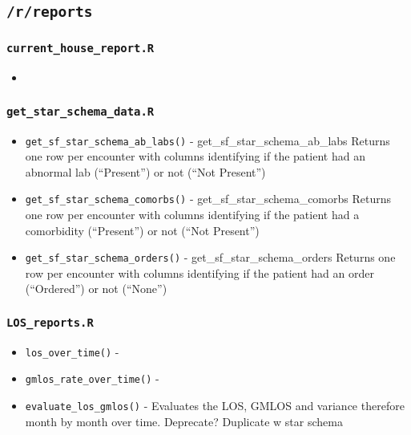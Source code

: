 \documentclass[
]{book}
\providecommand{\tightlist}{%
  \setlength{\itemsep}{0pt}\setlength{\parskip}{0pt}}
\begin{document}
\hypertarget{rreports}{%
\subsection{\texorpdfstring{\texttt{/r/reports}}{/r/reports}}\label{rreports}}

\hypertarget{current_house_report.r}{%
\subsubsection{\texorpdfstring{\texttt{current\_house\_report.R}}{current\_house\_report.R}}\label{current_house_report.r}}

\begin{itemize}
\item
\end{itemize}

\hypertarget{get_star_schema_data.r}{%
\subsubsection{\texorpdfstring{\texttt{get\_star\_schema\_data.R}}{get\_star\_schema\_data.R}}\label{get_star_schema_data.r}}

\begin{itemize}
\tightlist
\item
  \texttt{get\_sf\_star\_schema\_ab\_labs()} - get\_sf\_star\_schema\_ab\_labs Returns one row per encounter with columns identifying if the patient had an abnormal lab (``Present'') or not (``Not Present'')
\item
  \texttt{get\_sf\_star\_schema\_comorbs()} - get\_sf\_star\_schema\_comorbs Returns one row per encounter with columns identifying if the patient had a comorbidity (``Present'') or not (``Not Present'')
\item
  \texttt{get\_sf\_star\_schema\_orders()} - get\_sf\_star\_schema\_orders Returns one row per encounter with columns identifying if the patient had an order (``Ordered'') or not (``None'')
\end{itemize}

\hypertarget{los_reports.r}{%
\subsubsection{\texorpdfstring{\texttt{LOS\_reports.R}}{LOS\_reports.R}}\label{los_reports.r}}

\begin{itemize}
\tightlist
\item
  \texttt{los\_over\_time()} -
\item
  \texttt{gmlos\_rate\_over\_time()} -
\item
  \texttt{evaluate\_los\_gmlos()} - Evaluates the LOS, GMLOS and variance therefore month by month over time. Deprecate? Duplicate w star schema
\end{itemize}
\end{document}
